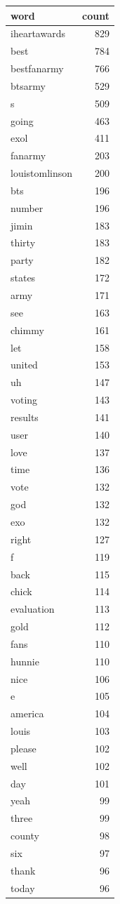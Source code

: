\begin{tabular}{lr}
\toprule
word & count \\
\midrule
iheartawards & 829 \\
best & 784 \\
bestfanarmy & 766 \\
btsarmy & 529 \\
s & 509 \\
going & 463 \\
exol & 411 \\
fanarmy & 203 \\
louistomlinson & 200 \\
bts & 196 \\
number & 196 \\
jimin & 183 \\
thirty & 183 \\
party & 182 \\
states & 172 \\
army & 171 \\
see & 163 \\
chimmy & 161 \\
let & 158 \\
united & 153 \\
uh & 147 \\
voting & 143 \\
results & 141 \\
user & 140 \\
love & 137 \\
time & 136 \\
vote & 132 \\
god & 132 \\
exo & 132 \\
right & 127 \\
f & 119 \\
back & 115 \\
chick & 114 \\
evaluation & 113 \\
gold & 112 \\
fans & 110 \\
hunnie & 110 \\
nice & 106 \\
e & 105 \\
america & 104 \\
louis & 103 \\
please & 102 \\
well & 102 \\
day & 101 \\
yeah & 99 \\
three & 99 \\
county & 98 \\
six & 97 \\
thank & 96 \\
today & 96 \\
\bottomrule
\end{tabular}
